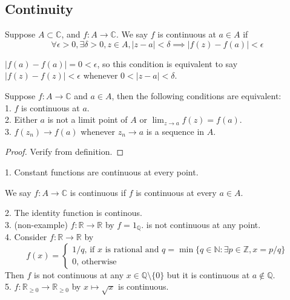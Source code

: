 \subsection{Continuity}
\begin{definition}
    Suppose $A\subset\mathbb C$, and $f:A\to\mathbb C$.
    We say $f$ is continuous at $a\in A$ if
    $$\forall\epsilon>0,\exists\delta>0,z\in A,|z-a|<\delta\implies |f(z)-f(a)|<\epsilon$$
\end{definition}
\begin{remark}
    $|f(a)-f(a)|=0<\epsilon$, so this condition is equivalent to say $|f(z)-f(z)|<\epsilon$ whenever $0<|z-a|<\delta$.
\end{remark}
\begin{proposition}
    Suppose $f:A\to\mathbb C$ and $a\in A$, then the following conditions are equivalent:\\
    1. $f$ is continuous at $a$.\\
    2. Either $a$ is not a limit point of $A$ or $\lim_{z\to a}f(z)=f(a)$.\\
    3. $f(z_n)\to f(a)$ whenever $z_n\to a$ is a sequence in $A$.
\end{proposition}
\begin{proof}
    Verify from definition.
\end{proof}
\begin{example}
    1. Constant functions are continuous at every point.
\end{example}
\begin{definition}
    We say $f:A\to\mathbb C$ is continuous if $f$ is continuous at every $a\in A$.
\end{definition}
\begin{definition}
    2. The identity function is continous.\\
    3. (non-example) $f:\mathbb R\to\mathbb R$ by $f=1_{\mathbb Q}$. is not continuous at any point.\\
    4. Consider $f:\mathbb R\to\mathbb R$ by
    $$f(x)=\begin{cases}
        1/q\text{, if $x$ is rational and $q=\min\{q\in\mathbb N:\exists p\in\mathbb Z,x=p/q\}$}\\
        0\text{, otherwise}
    \end{cases}$$
    Then $f$ is not continuous at any $x\in\mathbb Q\setminus\{0\}$ but it is continuous at $a\notin\mathbb Q$.\\
    5. $f:\mathbb R_{\ge 0}\to\mathbb R_{\ge 0}$ by $x\mapsto \sqrt{x}$ is continuous.
\end{definition}
